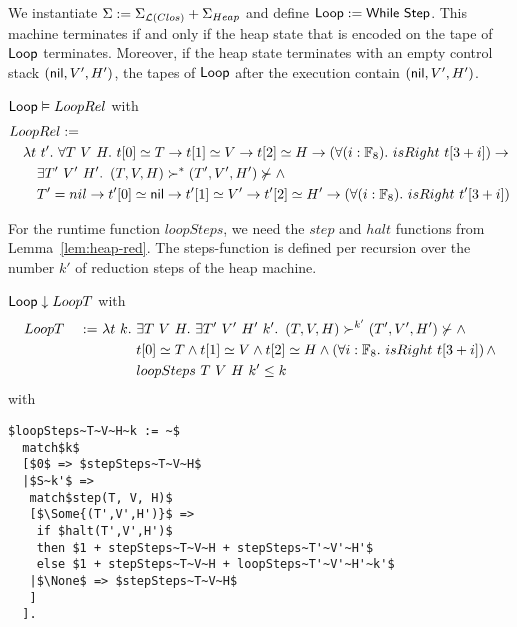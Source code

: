 We instantiate $\Sigma := \Sigma_{\mathcal{L}(Clos)} + \Sigma_{Heap}$ and define $\mathsf{Loop} := \mathsf{While}~\mathsf{Step}$.  This machine terminates if and only if
the heap state that is encoded on the tape of $\mathsf{Loop}$ terminates.  Moreover, if the heap state terminates with an empty control stack
$(\mathsf{nil}, V', H')$, the tapes of $\mathsf{Loop}$ after the execution contain $(\mathsf{nil}, V', H')$.

\begin{lemma}
  \label{lem:Loop_Realise}
  $\mathsf{Loop} \mathrel{\vDash} LoopRel$ with
  \begin{alignat*}{1}
    & LoopRel := \\
    &\quad \lambda t~t'.~\forall T~V~H.~ t[0] \simeq T \rightarrow t[1] \simeq V \rightarrow t[2] \simeq H \rightarrow \left(\forall (i:\mathbb{F}_8).~isRight~t[3+i]\right) \rightarrow \\
    &\qquad \exists T'~V'~H'.~ \left(T,V,H\right) \succ^* \left(T',V',H'\right) \nsucc \land \\ 
    &\qquad T' = nil \rightarrow t'[0] \simeq \mathsf{nil} \rightarrow t'[1] \simeq V' \rightarrow t'[2] \simeq H' \rightarrow \left(\forall (i:\mathbb{F}_8).~isRight~t'[3+i]\right)
  \end{alignat*}
\end{lemma}

For the runtime function $loopSteps$, we need the $step$ and $halt$ functions from Lemma~\ref{lem:heap-red}.  The steps-function is defined per
recursion over the number $k'$ of reduction steps of the heap machine.
\begin{lemma}
  \label{lem:Loop_Terminates}
  $\mathsf{Loop} \mathrel{\downarrow} LoopT$ with
  \begin{alignat*}{2}
    &LoopT &~:=~& \lambda t~k.~\exists T~V~H.~\exists T'~V'~H'~k'.~ \left(T,V,H\right) \succ^{k'} \left(T',V',H'\right) \nsucc \land \\
    &      &    & \phantom{\lambda t~k.}~t[0] \simeq T \land t[1] \simeq V \land t[2] \simeq H \land \left(\forall i:\mathbb{F}_8.~isRight~t[3+i]\right) \land \\
    &      &    & \phantom{\lambda t~k.}~loopSteps~T~V~H~k' \leq k
  \end{alignat*}
  with
  \small
\begin{lstlisting}[style=semicoqstyle]
$loopSteps~T~V~H~k := ~$
  match$k$
  [$0$ => $stepSteps~T~V~H$
  |$S~k'$ =>
   match$step(T, V, H)$
   [$\Some{(T',V',H')}$ =>
    if $halt(T',V',H')$
    then $1 + stepSteps~T~V~H + stepSteps~T'~V'~H'$
    else $1 + stepSteps~T~V~H + loopSteps~T'~V'~H'~k'$
   |$\None$ => $stepSteps~T~V~H$
   ]
  ].
\end{lstlisting}
\end{lemma}

